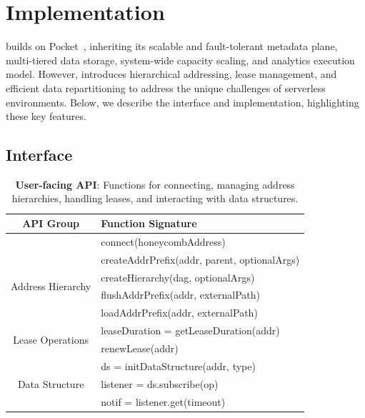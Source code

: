 \section{\jiffy Implementation}
\label{sec:jiffyimplementation}

\jiffy builds on Pocket~\cite{pocket}, inheriting its scalable and fault-tolerant metadata plane, multi-tiered data storage, system-wide capacity scaling, and analytics execution model. However, \jiffy introduces hierarchical addressing, lease management, and efficient data repartitioning to address the unique challenges of serverless environments. Below, we describe the \jiffy interface and implementation, highlighting these key features.

\subsection{\jiffy Interface}
\label{ssec:jiffyapi}

\begin{table}[t]
    \centering
    \footnotesize
    \begin{tabular}{c|l}
        \hline
        \textbf{API Group} & \textbf{Function Signature} \\
        \hline
        \multicolumn{1}{c|}{} & connect(honeycombAddress) \\
        \hline
        \multirow{4}{*}{Address Hierarchy} 
            & createAddrPrefix(addr, parent, optionalArgs) \\
            & createHierarchy(dag, optionalArgs) \\
            & flushAddrPrefix(addr, externalPath) \\
            & loadAddrPrefix(addr, externalPath) \\
        \hline
        \multirow{2}{*}{Lease Operations} 
            & leaseDuration = getLeaseDuration(addr) \\
            & renewLease(addr) \\
        \hline
        \multirow{3}{*}{Data Structure}
            & ds = initDataStructure(addr, type) \\
            & listener = ds.subscribe(op) \\
            & notif = listener.get(timeout) \\
        \hline
    \end{tabular}
    \caption[\jiffy User-facing API]{\textbf{\jiffy User-facing API}: Functions for connecting, managing address hierarchies, handling leases, and interacting with data structures.}
    \label{table:api}
\end{table}



